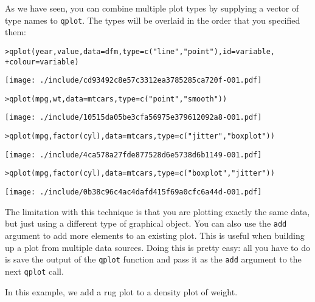 As we have seen, you can combine multiple plot types by supplying a vector of type names to {\tt qplot}.  The types will be overlaid in the order that you specified them:

\begin{alltt}
> qplot(year, value, data = dfm, type = c("line", "point"), id = variable, 
+     colour = variable)
\end{alltt}
\texttt{[image: ./include/cd93492c8e57c3312ea3785285ca720f-001.pdf]}
\begin{alltt}

> qplot(mpg, wt, data = mtcars, type = c("point", "smooth"))
\end{alltt}
\texttt{[image: ./include/10515da05be3cfa56975e379612092a8-001.pdf]}
\begin{alltt}

> qplot(mpg, factor(cyl), data = mtcars, type = c("jitter", "boxplot"))
\end{alltt}
\texttt{[image: ./include/4ca578a27fde877528d6e5738d6b1149-001.pdf]}
\begin{alltt}

> qplot(mpg, factor(cyl), data = mtcars, type = c("boxplot", "jitter"))
\end{alltt}
\texttt{[image: ./include/0b38c96c4ac4dafd415f69a0cfc6a44d-001.pdf]}
\begin{alltt}

\end{alltt}

The limitation with this technique is that you are plotting exactly the same data, but just using a different type of graphical object.  You can also use the {\tt add} argument to add more elements to an existing plot.  This is useful when building up a plot from multiple data sources. Doing this is pretty easy: all you have to do is save the output of the {\tt qplot} function and pass it as the {\tt add} argument to the next {\tt qplot} call.

In this example, we add a rug plot to a density plot of weight.

